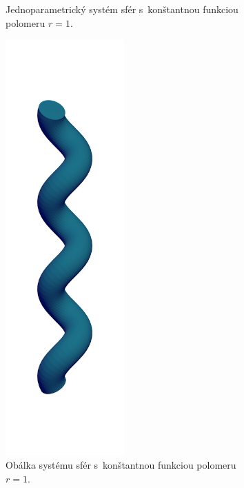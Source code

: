 \begin{figure}[t!]
\begin{subfigure}[t]{0.32\textwidth}
		\caption{Jednoparametrický systém sfér s~konštantnou funkciou polomeru $r=1.$}
        \label{fig:plocha7}
    \end{subfigure}
    \hfill
    \begin{subfigure}[t]{0.32\textwidth}
        \centering
        \includegraphics[width=0.5\textwidth]{images/helix_envelope.png}
        	\caption{Obálka systému sfér s~konštantnou funkciou polomeru $r=1$.}
        \label{fig:plocha8}
    \end{subfigure}
    \hfill
    \begin{subfigure}[t]{0.32\textwidth}

\end{subfigure}
\end{figure}
